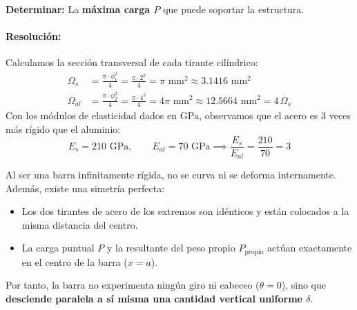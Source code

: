 \begin{center}
{%
    }
\end{center}

\textbf{Determinar:} La \textbf{máxima carga $P$} que puede soportar la estructura.

\paragraph{Resolución:}


Calculamos la sección transversal de cada tirante cilíndrico:
\begin{align}
    \Omega_s  & = \frac{\pi \cdot \phi_1^2}{4} = \frac{\pi \cdot 2^2}{4} = \pi\text{ mm}^2 \approx 3.1416\text{ mm}^2 \\
    \Omega_{al} & = \frac{\pi \cdot \phi_2^2}{4} = \frac{\pi \cdot 4^2}{4} = 4\pi\text{ mm}^2 \approx 12.5664\text{ mm}^2 = 4\,\Omega_s
\end{align}
Con los módulos de elasticidad dados en $\text{GPa}$, observamos que el acero es 3 veces más rígido que el aluminio:
\begin{equation}
    E_s = 210\text{ GPa}, \qquad E_{al} = 70\text{ GPa} \implies \frac{E_s}{E_{al}} = \frac{210}{70} = 3
\end{equation}


Al ser una barra infinitamente rígida, no se curva ni se deforma internamente. Además, existe una simetría perfecta:
\begin{itemize}
    \item Los dos tirantes de acero de los extremos son idénticos y están colocados a la misma distancia del centro.
    \item La carga puntual $P$ y la resultante del peso propio $P_{\text{propio}}$ actúan exactamente en el centro de la barra ($x = a$).
\end{itemize}
Por tanto, la barra no experimenta ningún giro ni cabeceo ($\theta = 0$), sino que \textbf{desciende paralela a sí misma una cantidad vertical uniforme $\delta$}.

